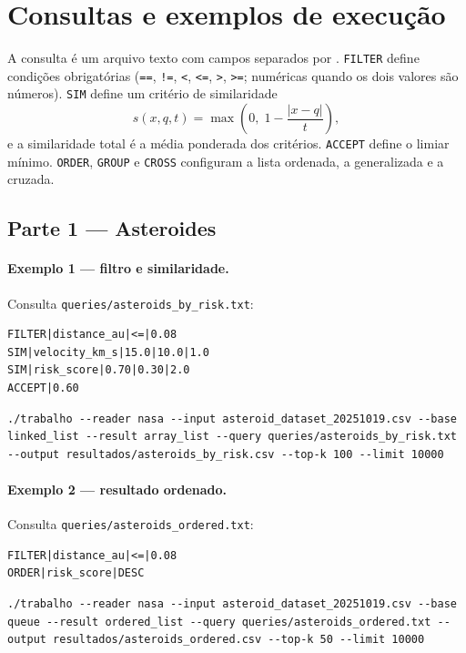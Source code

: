 \documentclass[11pt,a4paper]{article}
\begin{document}
\section{Consultas e exemplos de execução}\label{sec:exemplos}

A consulta é um arquivo texto com campos separados por \texttt{\textbar{}\allowbreak{}}. \texttt{FILTER} define condições obrigatórias (\texttt{==}, \texttt{!=}, \texttt{<}, \texttt{<=}, \texttt{>}, \texttt{>=}; numéricas quando os dois valores são números). \texttt{SIM} define um critério de similaridade
\[
  s(x,q,t)=\max\!\left(0,\;1-\frac{|x-q|}{t}\right),
\]
e a similaridade total é a média ponderada dos critérios. \texttt{ACCEPT} define o limiar mínimo. \texttt{ORDER}, \texttt{GROUP} e \texttt{CROSS} configuram a lista ordenada, a generalizada e a cruzada.

\subsection{Parte 1 --- Asteroides}

\paragraph{Exemplo 1 --- filtro e similaridade.} Consulta \texttt{queries/\allowbreak{}asteroids\_\allowbreak{}by\_\allowbreak{}risk.txt}:
\begin{lstlisting}
FILTER|distance_au|<=|0.08
SIM|velocity_km_s|15.0|10.0|1.0
SIM|risk_score|0.70|0.30|2.0
ACCEPT|0.60
\end{lstlisting}
\begin{lstlisting}
./trabalho --reader nasa --input asteroid_dataset_20251019.csv --base linked_list --result array_list --query queries/asteroids_by_risk.txt --output resultados/asteroids_by_risk.csv --top-k 100 --limit 10000
\end{lstlisting}

\paragraph{Exemplo 2 --- resultado ordenado.} Consulta \texttt{queries/\allowbreak{}asteroids\_\allowbreak{}ordered.txt}:
\begin{lstlisting}
FILTER|distance_au|<=|0.08
ORDER|risk_score|DESC
\end{lstlisting}
\begin{lstlisting}
./trabalho --reader nasa --input asteroid_dataset_20251019.csv --base queue --result ordered_list --query queries/asteroids_ordered.txt --output resultados/asteroids_ordered.csv --top-k 50 --limit 10000
\end{lstlisting}
\end{document}
